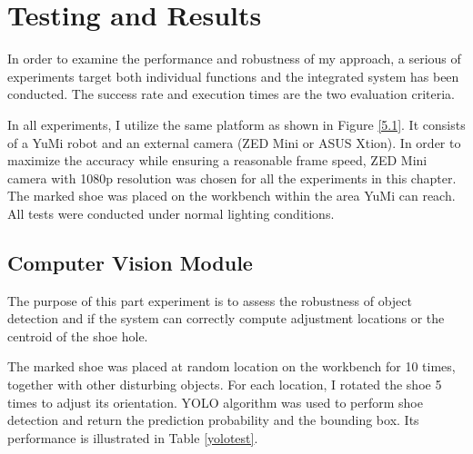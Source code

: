 \chapter{Testing and Results}

In order to examine the performance and robustness of my approach, a serious of experiments target both individual functions and the integrated system has been conducted. The success rate and execution times are the two evaluation criteria.

In all experiments, I utilize the same platform as shown in Figure \ref{5.1}. It consists of a YuMi robot and an external camera (ZED Mini or ASUS Xtion). In order to maximize the accuracy while ensuring a reasonable frame speed, ZED Mini camera with 1080p resolution was chosen for all the experiments in this chapter. The marked shoe was placed on the workbench within the area YuMi can reach. All tests were conducted under normal lighting conditions. 

\section{Computer Vision Module}
The purpose of this part experiment is to assess the robustness of object detection and if the system can correctly compute adjustment locations or the centroid of the shoe hole.

The marked shoe was placed at random location on the workbench for 10 times, together with other disturbing objects. For each location, I rotated the shoe 5 times to adjust its orientation. YOLO algorithm was used to perform shoe detection and return the prediction probability and the bounding box. Its performance is illustrated in Table \ref{yolotest}.


